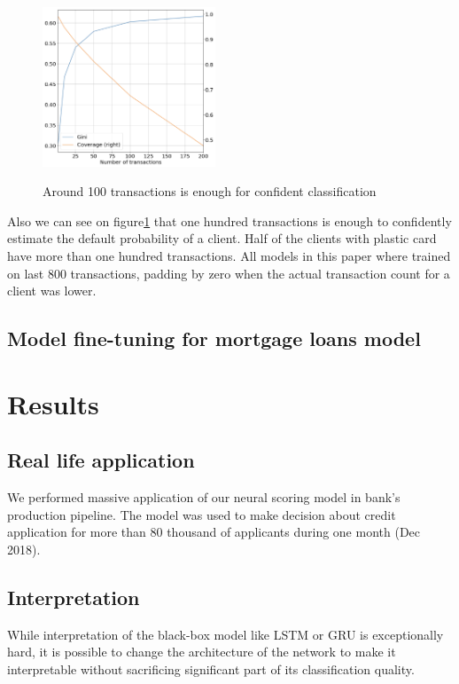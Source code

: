 \documentclass{sigkddExp}
\begin{document}
\begin{figure}
  \caption{Around 100 transactions is enough for confident classification}
  \includegraphics[width=0.46\textwidth]{information-vs-accuracy.png}
  \label{fig2}
\end{figure}

Also we can see on figure\ref{fig2} that one hundred transactions is enough to confidently estimate the default probability of a client. Half of the clients with plastic card have more than one hundred transactions. All models in this paper where trained on last 800 transactions, padding by zero when the actual transaction count for a client was lower.

\subsection{Model fine-tuning for mortgage loans model}

\section{Results}

\subsection{Real life application}

We performed massive application of our neural scoring model in bank's production pipeline. The model was used to make decision about credit application for more than 80 thousand of applicants during one month (Dec 2018).

\subsection{Interpretation}

While interpretation of the black-box model like LSTM or GRU is exceptionally hard, it is possible to change the architecture of the network to make it interpretable without sacrificing significant part of its classification quality.
\end{document}

